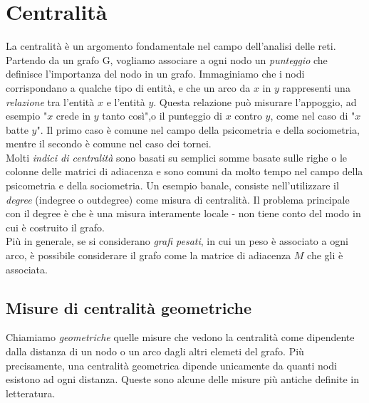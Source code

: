 \section{Centralità}
La centralità è un argomento fondamentale nel campo dell'analisi delle reti. Partendo da un grafo G, vogliamo associare a ogni nodo un \textit{punteggio} che definisce l'importanza del nodo in un grafo. Immaginiamo che i nodi corrispondano a qualche tipo di entità, e che un arco da $x$ in $y$ rappresenti una \textit{relazione} tra l'entità $x$ e l'entità $y$. Questa relazione può misurare l'appoggio, ad esempio "$x$ crede in $y$ tanto così",o il punteggio di $x$ contro $y$, come nel caso di "$x$ batte $y$". Il primo caso è comune nel campo della psicometria e della sociometria, mentre il secondo è comune nel caso dei tornei.\\
Molti \textit{indici di centralità} sono basati su semplici somme basate sulle righe o le colonne delle matrici di adiacenza e sono comuni da molto tempo nel campo della psicometria e della sociometria. Un esempio banale, consiste nell'utilizzare il \textit{degree} (indegree o outdegree) come misura di centralità. Il problema principale con il degree è che è una misura interamente locale - non tiene conto del modo in cui è costruito il grafo.\\
Più in generale, se si considerano \textit{grafi pesati}, in cui un peso è associato a ogni arco, è possibile considerare il grafo come la matrice di adiacenza $M$ che gli è associata.
\subsection{Misure di centralità geometriche}
Chiamiamo \textit{geometriche} quelle misure che vedono la centralità come dipendente dalla distanza di un nodo o un arco dagli altri elemeti del grafo. Più precisamente, una centralità geometrica dipende unicamente da quanti nodi esistono ad ogni distanza. Queste sono alcune delle misure più antiche definite in letteratura.
